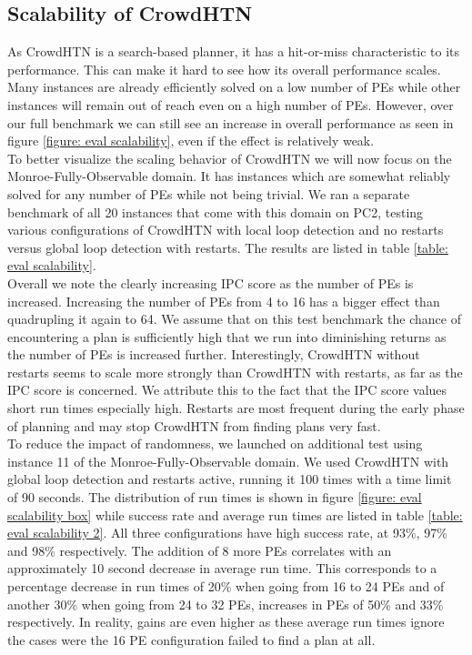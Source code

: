 \subsection{Scalability of CrowdHTN}
\label{eval: scalability}
As CrowdHTN is a search-based planner, it has a hit-or-miss characteristic to its performance. This can make it hard to see how its overall performance scales. Many instances are already efficiently solved on a low number of PEs while other instances will remain out of reach even on a high number of PEs. However, over our full benchmark we can still see an increase in overall performance as seen in figure \ref{figure: eval scalability}, even if the effect is relatively weak. \\
To better visualize the scaling behavior of CrowdHTN we will now focus on the Monroe-Fully-Observable domain. It has instances which are somewhat reliably solved for any number of PEs while not being trivial. We ran a separate benchmark of all 20 instances that come with this domain on PC2, testing various configurations of CrowdHTN with local loop detection and no restarts versus global loop detection with restarts. The results are listed in table \ref{table: eval scalability}.\\
Overall we note the clearly increasing IPC score as the number of PEs is increased. Increasing the number of PEs from 4 to 16 has a bigger effect than quadrupling it again to 64. We assume that on this test benchmark the chance of encountering a plan is sufficiently high that we run into diminishing returns as the number of PEs is increased further. Interestingly, CrowdHTN without restarts seems to scale more strongly than CrowdHTN with restarts, as far as the IPC score is concerned. We attribute this to the fact that the IPC score values short run times especially high. Restarts are most frequent during the early phase of planning and may stop CrowdHTN from finding plans very fast. \\
To reduce the impact of randomness, we launched on additional test using instance 11 of the Monroe-Fully-Observable domain. We used CrowdHTN with global loop detection and restarts active, running it 100 times with a time limit of 90 seconds. The distribution of run times is shown in figure \ref{figure: eval scalability box} while success rate and average run times are listed in table \ref{table: eval scalability 2}. All three configurations have high success rate, at 93\%, 97\% and 98\% respectively. The addition of 8 more PEs correlates with an approximately 10 second decrease in average run time. This corresponds to a percentage decrease in run times of 20\% when going from 16 to 24 PEs and of another 30\% when going from 24 to 32 PEs, increases in PEs of 50\% and 33\% respectively.
In reality, gains are even higher as these average run times ignore the cases were the 16 PE configuration failed to find a plan at all.

